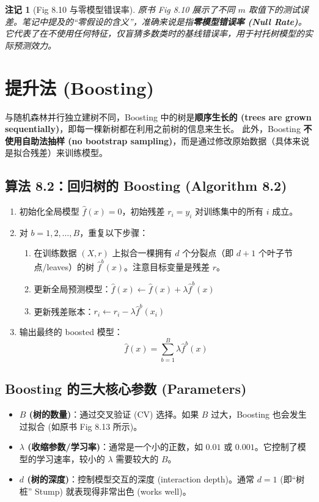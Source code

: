 \documentclass[UTF8]{ctexart}
\newtheorem{remark}{注记}[section]
\numberwithin{equation}{section}
\begin{document}
\begin{remark}[Fig 8.10 与零模型错误率]
原书 Fig 8.10 展示了不同 $m$ 取值下的测试误差。笔记中提及的“零假设的含义”，准确来说是指\textbf{零模型错误率 (Null Rate)}。它代表了在不使用任何特征，仅盲猜多数类时的基线错误率，用于衬托树模型的实际预测效力。
\end{remark}

\section{提升法 (Boosting)}
与随机森林并行独立建树不同，Boosting 中的树是\textbf{顺序生长的 (trees are grown sequentially)}，即每一棵新树都在利用之前树的信息来生长。
此外，Boosting \textbf{不使用自助法抽样 (no bootstrap sampling)}，而是通过修改原始数据（具体来说是拟合残差）来训练模型。

\subsection{算法 8.2：回归树的 Boosting (Algorithm 8.2)}
\begin{enumerate}
    \item 初始化全局模型 $\hat{f}(x) = 0$，初始残差 $r_i = y_i$ 对训练集中的所有 $i$ 成立。
    \item 对 $b = 1, 2, \dots, B$，重复以下步骤：
    \begin{enumerate}
        \item[(a)] 在训练数据 $(X, r)$ 上拟合一棵拥有 $d$ 个分裂点（即 $d+1$ 个叶子节点/leaves）的树 $\hat{f}^b(x)$。注意目标变量是残差 $r$。
        \item[(b)] 更新全局预测模型：$\hat{f}(x) \leftarrow \hat{f}(x) + \lambda \hat{f}^b(x)$
        \item[(c)] 更新残差账本：$r_i \leftarrow r_i - \lambda \hat{f}^b(x_i)$
    \end{enumerate}
    \item 输出最终的 boosted 模型：
    \begin{equation}
        \hat{f}(x) = \sum_{b=1}^B \lambda \hat{f}^b(x)
    \end{equation}
\end{enumerate}

\subsection{Boosting 的三大核心参数 (Parameters)}
\begin{itemize}
    \item \textbf{$B$ (树的数量)}：通过交叉验证 (CV) 选择。如果 $B$ 过大，Boosting 也会发生过拟合 (如原书 Fig 8.13 所示)。
    \item \textbf{$\lambda$ (收缩参数/学习率)}：通常是一个小的正数，如 $0.01$ 或 $0.001$。它控制了模型的学习速率，较小的 $\lambda$ 需要较大的 $B$。
    \item \textbf{$d$ (树的深度)}：控制模型交互的深度 (interaction depth)。通常 $d=1$ (即“树桩” Stump) 就表现得非常出色 (works well)。
\end{itemize}
\end{document}
